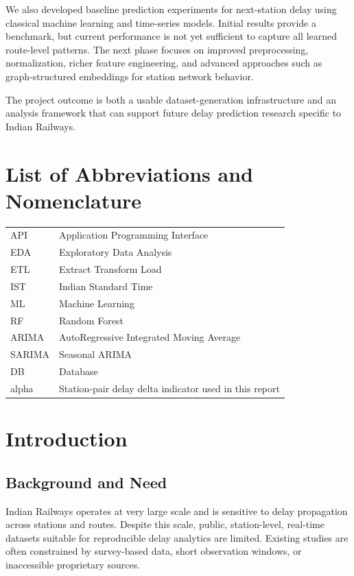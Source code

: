 \documentclass[12pt,a4paper]{report}
\begin{document}
We also developed baseline prediction experiments for next-station delay using classical machine learning and time-series models. Initial results provide a benchmark, but current performance is not yet sufficient to capture all learned route-level patterns. The next phase focuses on improved preprocessing, normalization, richer feature engineering, and advanced approaches such as graph-structured embeddings for station network behavior.

The project outcome is both a usable dataset-generation infrastructure and an analysis framework that can support future delay prediction research specific to Indian Railways.

\clearpage

\tableofcontents
\clearpage
\listoffigures
\clearpage
\listoftables
\clearpage

\chapter*{List of Abbreviations and Nomenclature}
\begin{longtable}{p{}p{}}
API & Application Programming Interface \\
EDA & Exploratory Data Analysis \\
ETL & Extract Transform Load \\
IST & Indian Standard Time \\
ML & Machine Learning \\
RF & Random Forest \\
ARIMA & AutoRegressive Integrated Moving Average \\
SARIMA & Seasonal ARIMA \\
DB & Database \\
alpha & Station-pair delay delta indicator used in this report \\
\end{longtable}

\clearpage
{}

\chapter{Introduction}

\section{Background and Need}
Indian Railways operates at very large scale and is sensitive to delay propagation across stations and routes. Despite this scale, public, station-level, real-time datasets suitable for reproducible delay analytics are limited. Existing studies are often constrained by survey-based data, short observation windows, or inaccessible proprietary sources.
\end{document}
